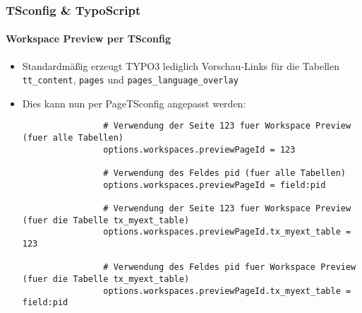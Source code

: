 \begin{frame}[fragile]
	\frametitle{TSconfig \& TypoScript}
	\framesubtitle{Workspace Preview per TSconfig}

	\lstset{basicstyle=\tiny\ttfamily}

	\begin{itemize}

		\item Standardmäßig erzeugt TYPO3 lediglich Vorschau-Links für die Tabellen \texttt{tt\_content},
			\texttt{pages} und \texttt{pages\_language\_overlay}

		\item Dies kann nun per PageTSconfig angepasst werden:

			\begin{lstlisting}
				# Verwendung der Seite 123 fuer Workspace Preview (fuer alle Tabellen)
				options.workspaces.previewPageId = 123

				# Verwendung des Feldes pid (fuer alle Tabellen)
				options.workspaces.previewPageId = field:pid

				# Verwendung der Seite 123 fuer Workspace Preview (fuer die Tabelle tx_myext_table)
				options.workspaces.previewPageId.tx_myext_table = 123

				# Verwendung des Feldes pid fuer Workspace Preview (fuer die Tabelle tx_myext_table)
				options.workspaces.previewPageId.tx_myext_table = field:pid
			\end{lstlisting}

	\end{itemize}

\end{frame}

